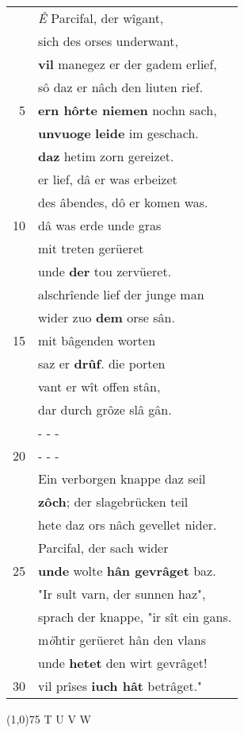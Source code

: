 \documentclass[8pt,a4paper,notitlepage]{article}
\begin{document}
\begin{table}[ht]
\begin{minipage}[t]{0.5\linewidth}
\begin{center}
\end{center}
\begin{tabular}{rl}
 & \textit{Ê} Parcifal, der wîgant,\\ 
 & sich des orses underwant,\\ 
 & \textbf{vil} manegez er der gadem erlief,\\ 
 & sô daz er nâch den liuten rief.\\ 
5 & \textbf{ern hôrte niemen} nochn sach,\\ 
 & \textbf{unvuoge} \textbf{leide} im geschach.\\ 
 & \textbf{daz} hetim zorn gereizet.\\ 
 & er lief, dâ er was erbeizet\\ 
 & des âbendes, dô er komen was.\\ 
10 & dâ was erde unde gras\\ 
 & mit treten gerüeret\\ 
 & unde \textbf{der} tou zervüeret.\\ 
 & alschrîende lief der junge man\\ 
 & wider zuo \textbf{dem} orse sân.\\ 
15 & mit bâgenden worten\\ 
 & saz er \textbf{drûf}. die porten\\ 
 & vant er wît offen stân,\\ 
 & dar durch grôze slâ gân.\\ 
 & \multicolumn{1}{l}{ - - - }\\ 
20 & \multicolumn{1}{l}{ - - - }\\ 
 & Ein verborgen knappe daz seil\\ 
 & \textbf{zôch}; der slagebrücken teil\\ 
 & hete daz ors nâch gevellet nider.\\ 
 & Parcifal, der sach wider\\ 
25 & \textbf{unde} wolte \textbf{hân gevrâget} baz.\\ 
 & "Ir sult varn, der sunnen haz",\\ 
 & sprach der knappe, "ir sît ein gans.\\ 
 & m\textit{ö}htir gerüeret hân den vlans\\ 
 & unde \textbf{hetet} den wirt gevrâget!\\ 
30 & vil prîses \textbf{iuch hât} betrâget."\\ 
\end{tabular}
\scriptsize
\line(1,0){75} \newline
T U V W \newline

\end{minipage}
\end{table}
\end{document}
